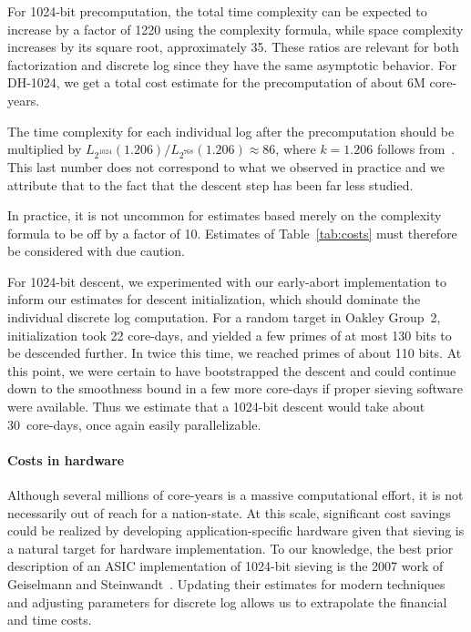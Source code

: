 For 1024-bit precomputation, the total time complexity can be expected to
increase by a factor of 1220 using the complexity formula, while space
complexity increases by its square root, approximately 35. These ratios are
relevant for both factorization and discrete log since they have the same
asymptotic behavior. For DH-1024, we get a total cost estimate for the
precomputation of about 6M core-years.

The time complexity for each individual log after the precomputation should
be multiplied by $L_{2^{1024}}(1.206)/L_{2^{768}}(1.206)\approx86$, where
$k=1.206$ follows from~\cite{hidden-snfs-1024-2017}. This last number does
not correspond to what we observed in practice and we attribute that to the
fact that the descent step has been far less studied.

In practice, it is not uncommon for estimates based merely on the complexity
formula to be off by a factor of 10. Estimates of Table~\ref{tab:costs} must
therefore be considered with due caution.

For 1024-bit descent, we experimented with our early-abort implementation to
inform our estimates for descent initialization, which should dominate the
individual discrete log computation. For a random target in Oakley Group~2,
initialization took 22 core-days, and yielded a few primes of at most 130
bits to be descended further. In twice this time, we reached primes of about
110 bits. At this point, we were certain to have bootstrapped the descent and
could continue down to the smoothness bound in a few more core-days if proper
sieving software were available. Thus we estimate that a 1024-bit descent
would take about 30~core-days, once again easily parallelizable.

\paragraph{Costs in hardware}
Although several millions of core-years is a massive computational effort, it
is not necessarily out of reach for a nation-state. At this scale,
significant cost savings could be realized by developing application-specific
hardware given that sieving is a natural target for hardware implementation.
To our knowledge, the best prior description of an ASIC implementation of
1024-bit sieving is the 2007 work of Geiselmann and
Steinwandt~\cite{hardware-scaling-nfs-2007}. Updating their estimates for
modern techniques and adjusting parameters for discrete log allows us to
extrapolate the financial and time costs.

